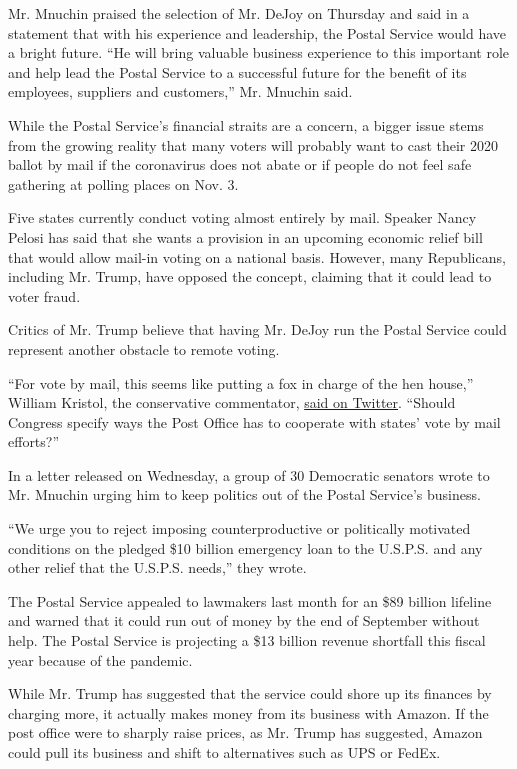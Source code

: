 Mr. Mnuchin praised the selection of Mr. DeJoy on Thursday and said in a
statement that with his experience and leadership, the Postal Service
would have a bright future. ``He will bring valuable business experience
to this important role and help lead the Postal Service to a successful
future for the benefit of its employees, suppliers and customers,'' Mr.
Mnuchin said.

While the Postal Service's financial straits are a concern, a bigger
issue stems from the growing reality that many voters will probably want
to cast their 2020 ballot by mail if the coronavirus does not abate or
if people do not feel safe gathering at polling places on Nov. 3.

Five states currently conduct voting almost entirely by mail. Speaker
Nancy Pelosi has said that she wants a provision in an upcoming economic
relief bill that would allow mail-in voting on a national basis.
However, many Republicans, including Mr. Trump, have opposed the
concept, claiming that it could lead to voter fraud.

Critics of Mr. Trump believe that having Mr. DeJoy run the Postal
Service could represent another obstacle to remote voting.

``For vote by mail, this seems like putting a fox in charge of the hen
house,'' William Kristol, the conservative commentator,
\href{https://twitter.com/BillKristol/status/1258222620115378176?s=20}{said
on Twitter}. ``Should Congress specify ways the Post Office has to
cooperate with states' vote by mail efforts?''

In a letter released on Wednesday, a group of 30 Democratic senators
wrote to Mr. Mnuchin urging him to keep politics out of the Postal
Service's business.

``We urge you to reject imposing counterproductive or politically
motivated conditions on the pledged \$10 billion emergency loan to the
U.S.P.S. and any other relief that the U.S.P.S. needs,'' they wrote.

The Postal Service appealed to lawmakers last month for an \$89 billion
lifeline and warned that it could run out of money by the end of
September without help. The Postal Service is projecting a \$13 billion
revenue shortfall this fiscal year because of the pandemic.

While Mr. Trump has suggested that the service could shore up its
finances by charging more, it actually makes money from its business
with Amazon. If the post office were to sharply raise prices, as Mr.
Trump has suggested, Amazon could pull its business and shift to
alternatives such as UPS or FedEx.

